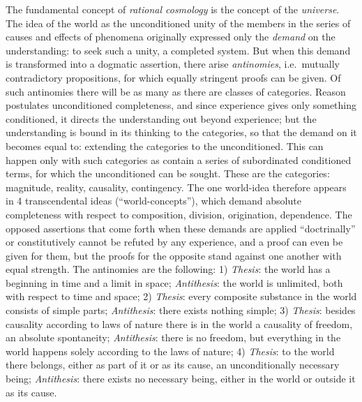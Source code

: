 The fundamental concept of \emph{rational cosmology} is the concept of
the \emph{universe}. The idea of the world as the unconditioned unity of
the members in the series of causes and effects of phenomena originally
expressed only the \emph{demand} on the understanding: to seek such a
unity, a completed system. But when this demand is transformed into a
dogmatic assertion, there arise \emph{antinomies}, i.e.\ mutually
contradictory propositions, for which equally stringent proofs can be
given. Of such antinomies there will be as many as there are classes of
categories. Reason postulates unconditioned completeness, and since
experience gives only something conditioned, it directs the understanding
out beyond experience; but the understanding is bound in its thinking to
the categories, so that the demand on it becomes equal to: extending the
categories to the unconditioned. This can happen only with such
categories as contain a series of subordinated conditioned terms, for
which the unconditioned can be sought. These are the categories:
magnitude, reality, causality, contingency. The one world-idea therefore
appears in 4 transcendental ideas (``world-concepts''), which demand
absolute completeness with respect to composition, division, origination,
dependence. The opposed assertions that come forth when these
demands are applied ``doctrinally'' or constitutively cannot be refuted
by any experience, and a proof can even be given for them, but the proofs
for the opposite stand against one another with equal strength. The
antinomies are the following: 1) \emph{Thesis}: the world has a beginning
in time and a limit in space; \emph{Antithesis}: the world is unlimited,
both with respect to time and space; 2) \emph{Thesis}: every composite
substance in the world consists of simple parts; \emph{Antithesis}: there
exists nothing simple; 3) \emph{Thesis}: besides causality according to
laws of nature there is in the world a causality of freedom, an absolute
spontaneity; \emph{Antithesis}: there is no freedom, but everything in
the world happens solely according to the laws of nature; 4)
\emph{Thesis}: to the world there belongs, either as part of it or as its
cause, an unconditionally necessary being; \emph{Antithesis}: there
exists no necessary being, either in the world or outside it as its
cause.

